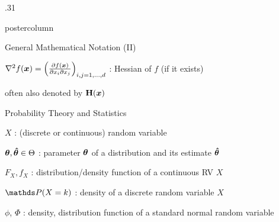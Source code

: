 \documentclass[11pt,compress,t,notes=noshow, xcolor=table]{beamer}
\begin{document}
\begin{frame}[fragile]{}
\begin{columns}
\begin{column}{.31\textwidth}
\begin{beamercolorbox}[center]{postercolumn}
\begin{minipage}{.98\textwidth}
{\begin{myblock}{General Mathematical Notation (II)}
						\begin{codebox}
							 $\nabla^2 f(\bm{x}) = \left(\frac{\partial f(\bm{x})}{\partial x_i \partial x_j}\right)_{i, j=1, ..., d}$ : Hessian of $f$ (if it exists)
						\end{codebox}
						\hspace*{1ex} often also denoted by $\mathbf{H}(\bm{x})$ \\
					\end{myblock}
						\vspace*{-2cm}
						\begin{myblock}{Probability Theory and Statistics}
						\begin{codebox}
							 $X$ : (discrete or continuous) random variable
						\end{codebox}
 						\hspace*{1ex} %
 						\hspace*{1ex}
						\begin{codebox}
							 $\bm{\theta}, \bm{\hat\theta} \in \Theta$ : parameter $\bm{\theta}$ of a distribution and its estimate $\bm{\hat\theta}$
						\end{codebox}
 						\hspace*{1ex}
						\begin{codebox}
							 $F_X, f_X$ : distribution/density function of a continuous RV $X$
						\end{codebox}
 						\hspace*{1ex} %
						\begin{codebox}
							 $\P(X = k)$ : density of a discrete random variable $X$
						\end{codebox}
 						\hspace*{1ex} %
						\begin{codebox}
							 $\phi$, $\Phi$ : density, distribution function of a standard normal random variable
						\end{codebox}
						\hspace*{1ex} %
					\end{myblock}
						\vfill
						}
			\end{minipage}
		\end{beamercolorbox}
	\end{column}

\end{columns}
\end{frame}
\end{document}
